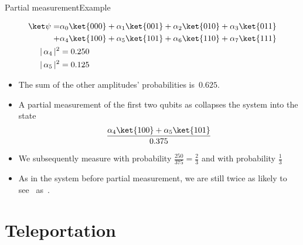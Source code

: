 \begin{frame}{Partial measurement}{Example}

\Vskip{-4em}\begin{align*}
  \QState{\relax}
   = & \alpha_{0} \ket{000}
  +  \alpha_{1} \ket{001}
  +  \alpha_{2} \ket{010}
  +  \alpha_{3} \ket{011} \\
  +  & \alpha_{4} \ket{100}
  +  \alpha_{5} \ket{101}
  +  \alpha_{6} \ket{110}
  +  \alpha_{7} \ket{111} \\
  \Prob{\alpha_{4}} & =0.250 \\
       \Prob{\alpha_{5}} & = 0.125
    \end{align*}
\Vskip{-3em}\begin{itemize}
   \item The sum of the other amplitudes' probabilities is~$0.625$.
   \item A partial measurement of the first two qubits as  collapses the system into the state
   \[
   \frac{\alpha_{4}\ket{100} + \alpha_{5}\ket{101}}{0.375}
   \]
   \item We subsequently measure  with probability $\frac{250}{375}=\frac{2}{3}$ and  with probability $\frac{1}{3}$
   \item As in the system before partial measurement, we are still twice as likely to see~ as~.
\end{itemize}
    
\end{frame}


\section*{Teleportation}

